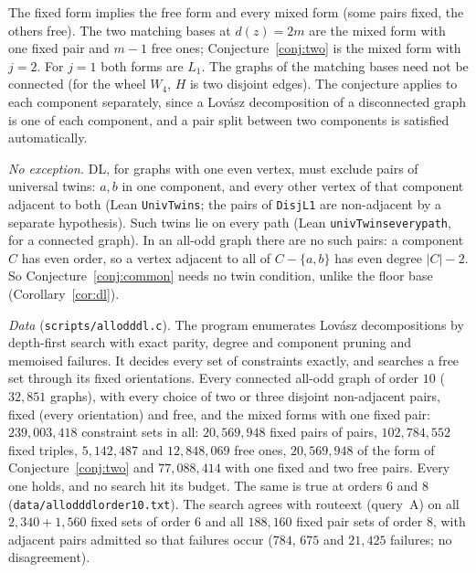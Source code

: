 \documentclass[11pt]{amsart}
\theoremstyle{definition}
\theoremstyle{remark}
\renewcommand{\_}{\oldunderscore\allowbreak}
\newcommand{\ALLODDTEN}{$239{,}003{,}418$ constraint sets in all: $20{,}569{,}948$ fixed pairs of
pairs, $102{,}784{,}552$ fixed triples, $5{,}142{,}487$ and $12{,}848{,}069$ free ones,
$20{,}569{,}948$ of the form of Conjecture~\ref{conj:two} and $77{,}088{,}414$ with one fixed and two
free pairs. Every one holds, and no search hit its budget. The same is true at orders $6$ and $8$
(\texttt{data/allodd\_dl\_order10.txt})}
\begin{document}
The fixed form implies the free form and every mixed form (some pairs fixed, the others free). The
two matching bases at $d(z)=2m$ are the mixed form with one fixed pair and $m-1$ free ones;
Conjecture~\ref{conj:two} is the mixed form with $j=2$. For $j=1$ both forms are $L_1$. The graphs of
the matching bases need not be connected (for the wheel $W_4$, $H$ is two disjoint edges). The
conjecture applies to each component separately, since a Lov\'asz decomposition of a disconnected
graph is one of each component, and a pair split between two components is satisfied
automatically.

\emph{No exception.} DL, for graphs with one even vertex, must exclude pairs of universal twins:
$a,b$ in one component, and every other vertex of that component adjacent to both (Lean
\texttt{UnivTwins}; the pairs of \texttt{DisjL1} are non-adjacent by a separate hypothesis). Such
twins lie on every path (Lean \texttt{univTwins\_every\_path}, for a connected graph). In an all-odd graph
there are no such pairs: a component $C$ has even order, so a vertex adjacent to all of $C-\{a,b\}$
has even degree $|C|-2$. So Conjecture~\ref{conj:common} needs no twin condition, unlike the floor
base (Corollary~\ref{cor:dl}).

\emph{Data} (\texttt{scripts/allodd\_dl.c}). The program enumerates Lov\'asz decompositions by
depth-first search with exact parity, degree and component pruning and memoised failures. It
decides every set of constraints exactly, and searches a free set through its fixed orientations.
Every connected all-odd graph of order $10$ ($32{,}851$ graphs), with every choice of two or three
disjoint non-adjacent pairs, fixed (every orientation) and free, and the mixed forms with one fixed
pair: \ALLODDTEN. The search agrees with route\_ext (query~A) on all $2{,}340+1{,}560$ fixed sets of
order $6$ and all $188{,}160$ fixed pair sets of order $8$, with adjacent pairs admitted so that
failures occur ($784$, $675$ and $21{,}425$ failures; no disagreement).
\end{document}
